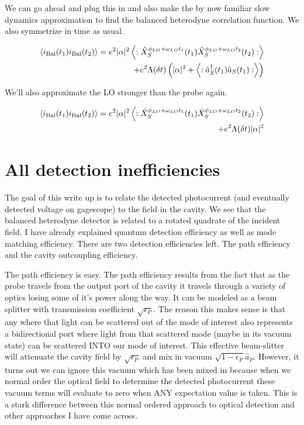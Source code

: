 \documentclass[12pt]{article}
\begin{document}
We can go ahead and plug this in and also make the by now familiar slow dynamics approximation to find the balanced heterodyne correlation function. We also symmetrize in time as usual.

\begin{align}
\braket{i_{\text{Bal}}(t_1)i_{\text{Bal}}(t_2)} = e^2 |\alpha|^2 \left<:\hat{X}_{S}^{\phi_{LO}+\omega_{LO}t_1}(t_1) \hat{X}_{S}^{\phi_{LO}+\omega_{LO} t_2}(t_2) :\right>\\
+e^2 \Lambda(\delta t) \left(|\alpha|^2 + \left<:\hat{a}^{\dag}_S(t_1)\hat{a}_S(t_1):\right>\right)
\end{align}

 We'll also approximate the LO stronger than the probe again.

\begin{align}
\braket{i_{\text{Bal}}(t_1)i_{\text{Bal}}(t_2)} = e^2 |\alpha|^2 \left<:\hat{X}_{S}^{\phi_{LO}+\omega_{LO}t_1}(t_1) \hat{X}_{S}^{\phi_{LO}+\omega_{LO} t_2}(t_2) :\right>\\
+e^2\Lambda(\delta t) |\alpha|^2
\end{align}


\section{All detection inefficiencies}
The goal of this write up is to relate the detected photocurrent (and eventually detected voltage on gagescope) to the field in the cavity. We see that the balanced heterodyne detector is related to a rotated quadrate of the incident field. I have already explained quantum detection efficiency as well as mode matching efficiency. There are two detection efficiencies left. The path efficiency and the cavity outcoupling efficiency. 

The path efficiency is easy. The path efficiency results from the fact that as the probe travels from the output port of the cavity it travels through a variety of optics losing some of it's power along the way. It can be modeled as a beam splitter with transmission coefficient $\sqrt{\epsilon_P}$. The reason this makes sense is that any where that light can be scattered out of the mode of interest also represents a bidirectional port where light from that scattered mode (maybe in its vacuum state) can be scattered INTO our mode of interest. This effective beam-slitter will attenuate the cavity field by $\sqrt{\epsilon_P}$ and mix in vacuum $\sqrt{1-\epsilon_P}\hat{a}_P$. However, it turns out we can ignore this vacuum which has been mixed in because when we normal order the optical field to determine the detected photocurrent these vacuum terms will evaluate to zero when ANY expectation value is taken. This is a stark difference between this normal ordered approach to optical detection and other approaches I have come across.
\end{document}
